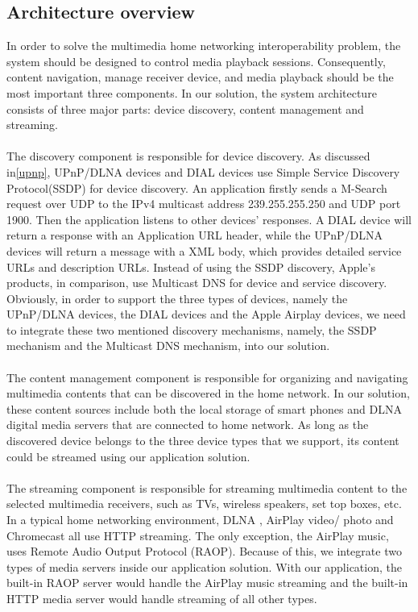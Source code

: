 \subsection{Architecture overview}
In order to solve the multimedia home networking interoperability problem, the system should be designed to control media playback sessions. Consequently, content navigation, manage receiver device, and media playback should be the most important three components. In our solution, the system architecture consists of three major parts: device discovery, content management and streaming.\\
\\
The discovery component is responsible for device discovery. As discussed
in\ref{upnp}, UPnP/DLNA devices and DIAL devices use Simple Service Discovery Protocol(SSDP) for device discovery. An application firstly sends a M-Search request over UDP to the IPv4 multicast address 239.255.255.250 and UDP port 1900. Then the application listens to other devices' responses. A DIAL device will return a response with an Application URL header, while the UPnP/DLNA devices will return a message with a XML body, which provides detailed service URLs and description URLs. Instead of using the SSDP discovery, Apple's products, in comparison, use Multicast DNS for device and service discovery. Obviously, in order to support the three types of devices, namely the UPnP/DLNA devices, the DIAL devices and the Apple Airplay devices, we need to integrate these two mentioned discovery mechanisms, namely, the SSDP mechanism and the Multicast DNS mechanism, into our solution.\\
\\
The content management component is responsible for organizing and
 navigating multimedia contents that can be discovered in the home network. In our solution, these content sources include both the local storage of smart phones and DLNA digital media servers that are connected to home network. As long as the discovered device belongs to the three device types that we support, its content could be streamed using our application solution.\\
\\
The streaming component is responsible for streaming multimedia content to the selected multimedia receivers, such as TVs, wireless speakers, set top boxes, etc. In a typical home networking environment, DLNA , AirPlay video/ photo and Chromecast all use HTTP streaming. The only exception, the AirPlay music, uses Remote Audio Output Protocol (RAOP). Because of this, we integrate two types of media servers inside our application solution. With our application, the built-in RAOP server would handle the AirPlay music streaming and the built-in HTTP media server would handle streaming of all other types.

